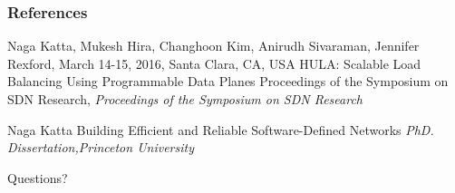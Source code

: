 \documentclass{beamer}
\begin{document}
\begin{frame}
\frametitle{References}
\footnotesize{
\begin{thebibliography}{99} %
 Naga Katta, Mukesh Hira, Changhoon Kim, Anirudh Sivaraman, Jennifer Rexford, March 14-15, 2016, Santa Clara, CA, USA
\newblock HULA: Scalable Load Balancing Using
Programmable Data Planes
 Proceedings of the Symposium on SDN Research,
\newblock \emph{Proceedings of the Symposium on SDN Research}
\end{thebibliography}
\begin{thebibliography}{99} %
	 Naga Katta
	\newblock Building Efficient and Reliable Software-Defined Networks
	\newblock \emph{ PhD. Dissertation,Princeton University}
\end{thebibliography}
}
\end{frame}


\begin{frame}
\Huge{\centerline{Questions?}}
\end{frame}

\end{document}
